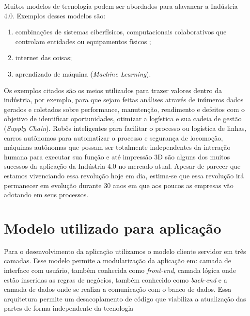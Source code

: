 \documentclass[../../layout.tex]{subfiles}
\begin{document}
\hspace*{3em}Muitos modelos de tecnologia podem ser abordados para alavancar a Indústria 4.0. Exemplos desses modelos são:
\begin{enumerate}[label=\alph*)]
\itemsep0em
    \item combinações de sistemas ciberfísicos, computacionais colaborativos que controlam entidades ou equipamentos físicos \cite{cyberphysic};
    \item internet das coisas;
    \item aprendizado de máquina (\emph{Machine Learning}).
\end{enumerate}


\hspace*{3em}Os exemplos citados são os meios utilizados para trazer valores dentro da indústria, por exemplo, para que sejam feitas análises através de inúmeros dados gerados e coletados sobre performance, manutenção, rendimento e defeitos com o objetivo de identificar oportunidades, otimizar a logística e sua cadeia de gestão (\emph{Supply Chain}). Robôs inteligentes para facilitar o processo ou logística de linhas, carros autônomos para automatizar o processo e segurança de locomoção, máquinas autônomas que possam ser totalmente independentes da interação humana para executar sua função e até impressão 3D são alguns dos muitos sucessos da aplicação da Indústria 4.0 no mercado atual. Apesar de parecer que estamos vivenciando essa revolução hoje em dia, estima-se que essa revolução irá permanecer em evolução durante 30 anos em que aos poucos as empresas vão adotando em seus processos.

\section{Modelo utilizado para aplicação}
\hspace*{3em}Para o desenvolvimento da aplicação utilizamos o modelo cliente servidor em três camadas. Esse modelo permite a modularização da aplicação em: camada de interface com usuário, também conhecida como \emph{front-end}, camada lógica onde estão inseridas as regras de negócios, também conhecido como \emph{back-end} e a camada de dados  onde se realiza a comunicação com o banco de dados. Essa arquitetura permite um desacoplamento de código que viabiliza a atualização das partes de forma independente da tecnologia \cite{3layers}
\end{document}
